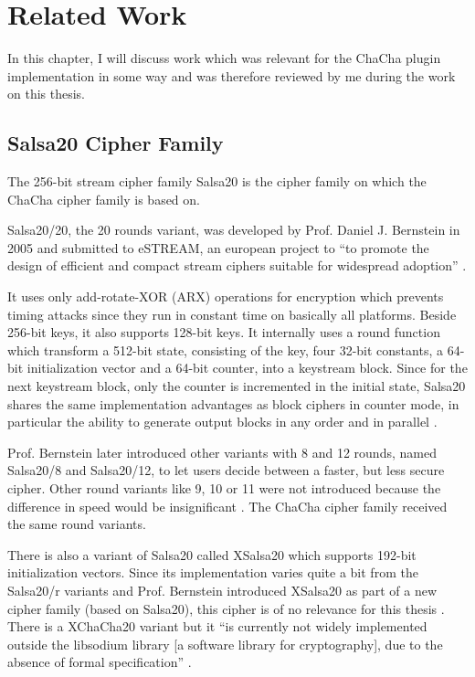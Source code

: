 \chapter{Related Work}
\label{sec:relatedWork}

In this chapter, I will discuss work which was relevant for the ChaCha plugin implementation in some way and was therefore reviewed by me during the work on this thesis.

\section{Salsa20 Cipher Family}
\label{sec:salsaCipher}

The 256-bit stream cipher family Salsa20 is the cipher family on which the ChaCha cipher family is based on.

Salsa20/20, the 20 rounds variant, was developed by Prof. Daniel J. Bernstein in 2005 \cite{salsaspec} and submitted to eSTREAM, an european project to ``to promote the design of efficient and compact stream ciphers suitable for widespread adoption'' \cite{estream}.

It uses only add-rotate-XOR (ARX) operations for encryption which prevents timing attacks since they run in constant time on basically all platforms. Beside 256-bit keys, it also supports 128-bit keys. It internally uses a round function which transform a 512-bit state, consisting of the key, four 32-bit constants, a 64-bit initialization vector and a 64-bit counter, into a keystream block. Since for the next keystream block, only the counter is incremented in the initial state, Salsa20 shares the same implementation advantages as block ciphers in counter mode, in particular the ability to generate output blocks in any order and in parallel \cite{salsaspec}.

Prof. Bernstein later introduced other variants with 8 and 12 rounds, named Salsa20/8 and Salsa20/12, to let users decide between a faster, but less secure cipher. Other round variants like 9, 10 or 11 were not introduced because the difference in speed would be insignificant \cite{salsa812}. The ChaCha cipher family received the same round variants. 

There is also a variant of Salsa20 called XSalsa20 which supports 192-bit initialization vectors. Since its implementation varies quite a bit from the Salsa20/r variants and Prof. Bernstein introduced XSalsa20 as part of a new cipher family (based on Salsa20), this cipher is of no relevance for this thesis \cite{xsalsa20spec}. There is a XChaCha20 variant but it ``is currently not widely implemented outside the libsodium library [a software library for cryptography], due to the absence of formal specification'' \cite{xchacha20}.

